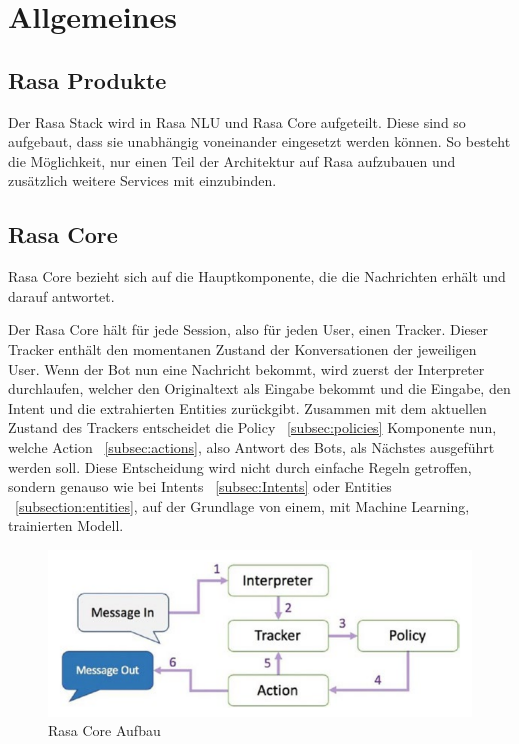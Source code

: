 \section{Allgemeines}\label{sec:overview}

\subsection{Rasa Produkte}\label{sec:rasa-products}

Der Rasa Stack wird in Rasa NLU und Rasa Core aufgeteilt.
Diese sind so aufgebaut, dass sie unabhängig voneinander eingesetzt werden können.
So besteht die Möglichkeit, nur einen Teil der Architektur auf Rasa aufzubauen und zusätzlich weitere Services mit einzubinden.

\subsection{Rasa Core}\label{subsec:rasa-core}

Rasa Core bezieht sich auf die Hauptkomponente, die die Nachrichten erhält und darauf antwortet.\cite{rasaCore}

Der Rasa Core hält für jede Session, also für jeden User, einen Tracker.
Dieser Tracker enthält den momentanen Zustand der Konversationen der jeweiligen User.
Wenn der Bot nun eine Nachricht bekommt, wird zuerst der Interpreter durchlaufen, welcher den Originaltext als Eingabe bekommt und die Eingabe, den Intent und die extrahierten Entities zurückgibt.
Zusammen mit dem aktuellen Zustand des Trackers entscheidet die Policy ~\ref{subsec:policies} Komponente nun, welche Action ~\ref{subsec:actions}, also Antwort des Bots, als Nächstes ausgeführt werden soll.
Diese Entscheidung wird nicht durch einfache Regeln getroffen, sondern genauso wie bei Intents ~\ref{subsec:Intents} oder Entities ~\ref{subsection:entities}, auf der Grundlage von einem, mit Machine Learning, trainierten Modell.\cite{rasaCore, rasaCoreBook}

\begin{figure}[hbt!]
    \centering
    \includegraphics[scale=0.5]{pics/rasa-core}
    \caption{Rasa Core Aufbau~\cite{rasaCoreBook}}
    \label{fig:rasa_core}
\end{figure}

